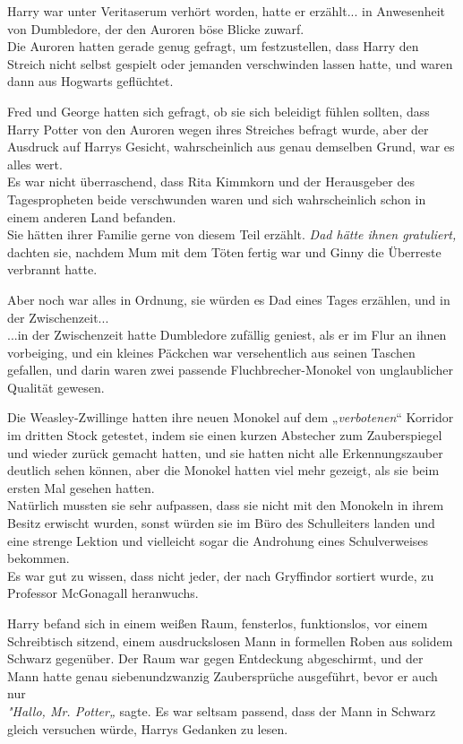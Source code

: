 {Harry war unter Veritaserum verhört worden, hatte er erzählt... in Anwesenheit von Dumbledore, der den Auroren böse Blicke zuwarf.\\ Die Auroren hatten gerade genug gefragt, um festzustellen, dass Harry den Streich nicht selbst gespielt oder jemanden verschwinden lassen hatte, und waren dann aus Hogwarts geflüchtet.

Fred und George hatten sich gefragt, ob sie sich beleidigt fühlen sollten, dass Harry Potter von den Auroren wegen ihres Streiches befragt wurde, aber der Ausdruck auf Harrys Gesicht, wahrscheinlich aus genau demselben Grund, war es alles wert.\\ Es war nicht überraschend, dass Rita Kimmkorn und der Herausgeber des Tagespropheten beide verschwunden waren und sich wahrscheinlich schon in einem anderen Land befanden.\\ Sie hätten ihrer Familie gerne von diesem Teil erzählt. \emph{Dad hätte ihnen gratuliert,} dachten sie, nachdem Mum mit dem Töten fertig war und Ginny die Überreste verbrannt hatte.

Aber noch war alles in Ordnung, sie würden es Dad eines Tages erzählen, und in der Zwischenzeit...\\ ...in der Zwischenzeit hatte Dumbledore zufällig geniest, als er im Flur an ihnen vorbeiging, und ein kleines Päckchen war versehentlich aus seinen Taschen gefallen, und darin waren zwei passende Fluchbrecher-Monokel von unglaublicher Qualität gewesen.

Die Weasley-Zwillinge hatten ihre neuen Monokel auf dem „\emph{verbotenen}“ Korridor im dritten Stock getestet, indem sie einen kurzen Abstecher zum Zauberspiegel und wieder zurück gemacht hatten, und sie hatten nicht alle Erkennungszauber deutlich sehen können, aber die Monokel hatten viel mehr gezeigt, als sie beim ersten Mal gesehen hatten.\\ Natürlich mussten sie sehr aufpassen, dass sie nicht mit den Monokeln in ihrem Besitz erwischt wurden, sonst würden sie im Büro des Schulleiters landen und eine strenge Lektion und vielleicht sogar die Androhung eines Schulverweises bekommen.\\ Es war gut zu wissen, dass nicht jeder, der nach Gryffindor sortiert wurde, zu Professor McGonagall heranwuchs.

Harry befand sich in einem weißen Raum, fensterlos, funktionslos, vor einem Schreibtisch sitzend, einem ausdruckslosen Mann in formellen Roben aus solidem Schwarz gegenüber. Der Raum war gegen Entdeckung abgeschirmt, und der Mann hatte genau siebenundzwanzig Zaubersprüche ausgeführt, bevor er auch nur\\ \emph{"Hallo, Mr. Potter„} sagte. Es war seltsam passend, dass der Mann in Schwarz gleich versuchen würde, Harrys Gedanken zu lesen.

}

